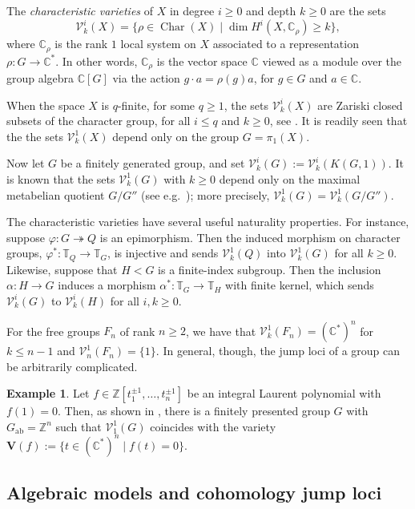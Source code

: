\documentclass{article}
\numberwithin{equation}{section}
\theoremstyle{definition}
\newtheorem{example}[theorem]{Example}
\newcommand{\Z}{\mathbb{Z}}
\renewcommand{\C}{\mathbb{C}}
\newcommand{\T}{\mathbb{T}}
\newcommand{\VV}{\mathcal{V}}
\DeclareMathOperator{\ab}{{ab}}
\DeclareMathOperator{\Char}{Char}
\newcommand{\surj}{\twoheadrightarrow}
\begin{document}
The {\em characteristic varieties}\/ of $X$ in degree $i\ge 0$ and 
depth $k\ge 0$ are the sets 
%
\begin{equation}
\label{eq:defjump}
\VV^i_k(X) =\{ \rho \in \Char(X) \mid 
\dim H^i(X, \C_{\rho} )\ge k\} ,
\end{equation}
where $\C_{\rho}$ is the rank $1$ local system on $X$ associated to 
a representation $\rho\colon G\to \C^{*}$. In other words, $\C_{\rho}$ 
is the vector space $\C$ viewed as a module over the group algebra $\C[G]$ 
via the action $g\cdot a=\rho(g) a$, for $g\in G$ and $a\in \C$. 

When the space $X$ is $q$-finite, for some $q\ge 1$, the sets 
$\VV^i_k(X)$ are Zariski closed subsets of the character group, 
for all $i\le q$ and $k\ge 0$, see \cite{PS-mrl}. It is readily seen that the 
the sets $\VV^1_k(X)$ depend only on the group $G=\pi_1(X)$. 

Now let $G$ be a finitely generated group, and set 
$\VV^i_k(G):=\VV^i_k(K(G,1))$.  It is known that the sets 
$\VV^1_k(G)$ with $k\ge 0$ depend only on 
the maximal metabelian quotient $G/G''$ 
(see e.g.~\cite{DPS-imrn}); 
more precisely, $\VV^1_k(G)=\VV^1_k(G/G'')$.

The characteristic varieties have several useful naturality properties.  
For instance, suppose $\varphi\colon G\surj Q$ is an epimorphism. 
Then the induced morphism on character groups, $\varphi^*\colon 
\T_Q\to \T_G$, is injective and sends $\VV^1_k(Q)$ 
into $\VV^1_k(G)$  for all  $k\ge 0$.  
Likewise, suppose that $H<G$ is a finite-index subgroup.  Then 
the inclusion $\alpha\colon H\to G$ induces a 
morphism $\alpha^*\colon \T_G\to \T_H$ with finite 
kernel, which sends $\VV^i_k(G)$ to $\VV^i_k(H)$ for all  $i,k\ge 0$.  

For the free groups $F_n$ of rank $n\ge 2$, we have that 
$\VV^1_k(F_n)=(\C^{*})^n$ for $k\le n-1$ and $\VV^1_n(F_n)=\{1\}$. 
In general, though, the jump loci of a group can be arbitrarily complicated.  

\begin{example}
\label{ex:syz}
Let $f\in \Z[t_1^{\pm 1},\dots , t_n^{\pm 1}]$ 
be an integral Laurent polynomial with $f(1)=0$.   
Then, as shown in \cite{SYZ}, there is a finitely presented group $G$ 
with $G_{\ab}=\Z^n$ such that $\VV^1_1(G)$ coincides with 
the variety $\mathbf{V}(f):=\{t \in (\C^{*})^n \mid f(t)=0\}$.  
\end{example}

\subsection{Algebraic models and cohomology jump loci}
\label{subsec:mod-cjl}
\end{document}
